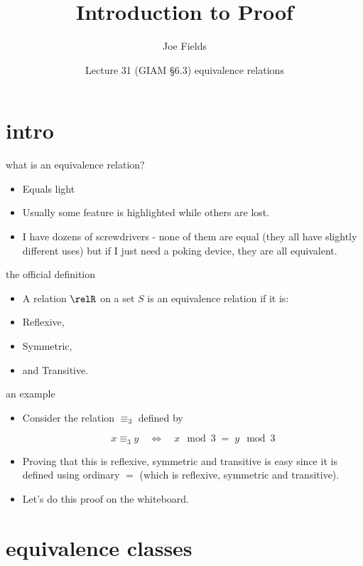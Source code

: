 \documentclass[handout,landscape]{beamer}
\author{Joe Fields}
\title{Introduction to Proof}
\date{Lecture 31 (GIAM \S 6.3) \newline equivalence relations}
\institute[SCSU]{ {\tt fieldsj1@southernct.edu} }
\begin{document}
\begin{frame}[plain]
  \titlepage
\end{frame}

\section{intro}

\begin{frame}{what is an equivalence relation?}
\begin{itemize}
\item Equals light\pause
\item Usually some feature is highlighted while others are lost. \pause
\item I have dozens of screwdrivers - none of them are equal (they all have slightly different uses) but if I just need a poking device, they are all equivalent.  \pause
\end{itemize}
\end{frame}

\begin{frame}{the official definition}
\begin{itemize}
\item A relation $\relR$ on a set $S$ is an equivalence relation if it is:\pause
\item Reflexive,\pause
\item Symmetric,\pause
\item and Transitive.
\end{itemize}
\end{frame}

\begin{frame}{an example}
\begin{itemize}
\item Consider the relation $\equiv_3$ defined by

\[ x \equiv_3 y \quad \iff \quad x \mod{3} \; = \; y \mod{3} \] \pause
\item Proving that this is reflexive, symmetric and transitive is easy since it is defined using ordinary $=$ (which is reflexive, symmetric and transitive).  \pause
\item Let's do this proof on the whiteboard.
\end{itemize}
\end{frame}

\section{equivalence classes}
\end{document}
